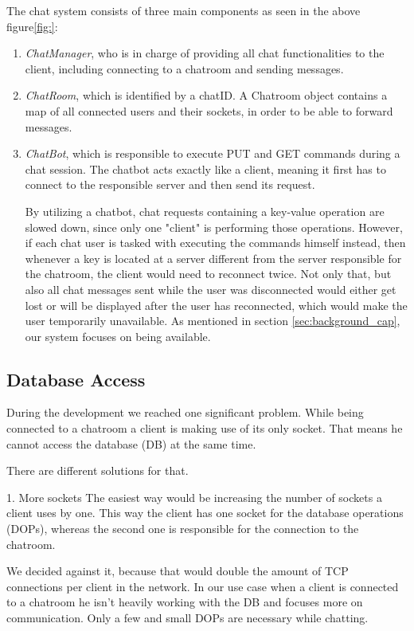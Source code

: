 The chat system consists of three main components as seen in the above figure\ref{fig:}:
\begin{enumerate}
	\item \textit{ChatManager}, who is in charge of providing all chat functionalities to the client, including connecting to a chatroom and sending messages.
	\item \textit{ChatRoom}, which is identified by a chatID. A Chatroom object contains a map of all connected users and their sockets, in order to be able to forward messages.
	\item \textit{ChatBot}, which is responsible to execute PUT and GET commands during a chat session. The chatbot acts exactly like a client, meaning it first has to connect to the responsible server and then send its request.
	
By utilizing a chatbot, chat requests containing a key-value operation are slowed down, since only one "client" is performing those operations. However, if each chat user is tasked with executing the commands himself instead, then whenever a key is located at a server different from the server responsible for the chatroom, the client would need to reconnect twice. Not only that, but also all chat messages sent while the user was disconnected would either get lost or will be displayed after the user has reconnected, which would make the user temporarily unavailable. As mentioned in section \ref{sec:background_cap}, our system focuses on being available. 	

\end{enumerate}

\subsection{Database Access}
\label{sec:groupchat_chatbot}

During the development we reached one significant problem. While being connected to a chatroom a client is making use of its only socket. That means he cannot access the database (DB) at the same time.

There are different solutions for that.

1.	More sockets 
The easiest way would be increasing the number of sockets a client uses by one. This way the client has one socket for the database operations (DOPs), whereas the second one is responsible for the connection to the chatroom.

We decided against it, because that would double the amount of TCP connections per client in the network. In our use case when a client is connected to a chatroom he isn’t heavily working with the DB and focuses more on communication. Only a few and small DOPs are necessary while chatting.


